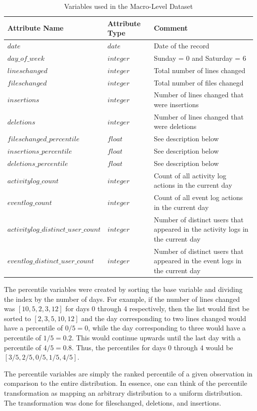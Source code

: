 \documentclass[12pt]{article}
\begin{document}
\begin{table}[h!]
\caption{Variables used in the Macro-Level Dataset}
\begin{tabular}{l | l | l}
\centering
Attribute Name & Attribute Type & Comment \\
\hline \hline
$date$ & $date$ & Date of the record \\  
$day\_of\_week$ & $integer$ & Sunday = 0 and Saturday = 6 \\
$lineschanged$ & $integer$ & Total number of lines changed \\
$fileschanged$ & $integer$ & Total number of files chanegd \\
$insertions$ & $integer$ & Number of lines changed that were insertions \\
$deletions$ & $integer$ & Number of lines changed that were deletions \\
$fileschanged\_percentile$ & $float$ & See description below \\
$insertions\_percentile$ & $float$ & See description below \\
$deletions\_percentile$ & $float$ & See description below \\
$activitylog\_count$ & $integer$ & Count of all activity log actions in the current day \\
$eventlog\_count$ & $integer$ & Count of all event log actions in the current day \\
$activitylog\_distinct\_user\_count$ & $integer$ & Number of distinct users that appeared in the activity logs in the current day \\
$eventlog\_distinct\_user\_count$ & $integer$ & Number of distinct users that appeared in the event logs in the current day \\
\end{tabular}
\end{table}

The percentile variables were created by sorting the base variable and dividing the index by the number of days. For example, if the number of lines changed was $[10,5,2,3,12]$ for days 0 through 4 respectively, then the list would first be sorted to $[2,3,5,10,12]$ and the day corresponding to two lines changed would have a percentile of $0/5 = 0$, while the day corresponding to three would have a percentile of $1/5 = 0.2$. This would continue upwards until the last day with a percentile of $4/5 = 0.8$. Thus, the percentiles for days 0 through 4 would be $[3/5, 2/5, 0/5, 1/5, 4/5]$. 

The percentile variables are simply the ranked percentile of a given observation in comparison to the entire distribution. In essence, one can think of the percentile transformation as mapping an arbitrary distribution to a uniform distribution. The transformation was done for fileschanged, deletions, and insertions.
\end{document}
